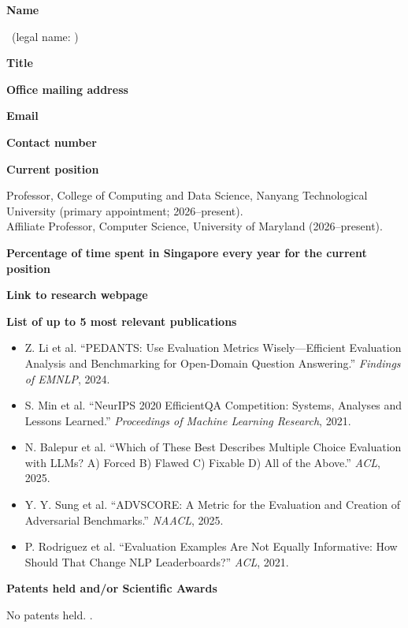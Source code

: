 \documentclass[12pt,a4paper]{article}
\newcommand{\field}[2]{\noindent
  \begin{minipage}[t]{0.31\linewidth}\raggedright\textbf{#1}\end{minipage}\hfill
  \begin{minipage}[t]{0.67\linewidth}\raggedright#2\end{minipage}
  \par\vspace{2pt}}
\begin{document}
\raggedright
\field{Name}{\CVname\ (legal name: \CVlegalname)}
\field{Title}{\CVtitle}
\field{Office mailing address}{\CVaddress}
\field{Email}{\href{mailto:\CVemail}{\CVemail}}
\field{Contact number}{\CVphone}
\field{Current position}{Professor, College of Computing and Data Science, Nanyang Technological University (primary appointment; 2026--present). \\ Affiliate Professor, Computer Science, University of Maryland (2026--present).}
\field{Percentage of time spent in Singapore every year for the current position}{\CVsingaporetime}
\field{Link to research webpage}{\href{\CVweb}{\CVweb}}

\field{List of up to 5 most relevant publications}{
  \begin{itemize}
    \item Z. Li et al. ``PEDANTS: Use Evaluation Metrics Wisely---Efficient Evaluation Analysis and Benchmarking for Open-Domain Question Answering.'' \textit{Findings of EMNLP}, 2024.
    \item S. Min et al. ``NeurIPS 2020 EfficientQA Competition: Systems, Analyses and Lessons Learned.'' \textit{Proceedings of Machine Learning Research}, 2021.
    \item N. Balepur et al. ``Which of These Best Describes Multiple Choice Evaluation with LLMs? A) Forced B) Flawed C) Fixable D) All of the Above.'' \textit{ACL}, 2025.
    \item Y. Y. Sung et al. ``ADVSCORE: A Metric for the Evaluation and Creation of Adversarial Benchmarks.'' \textit{NAACL}, 2025.
    \item P. Rodriguez et al. ``Evaluation Examples Are Not Equally Informative: How Should That Change NLP Leaderboards?'' \textit{ACL}, 2021.
  \end{itemize}}

\field{Patents held and/or Scientific Awards}{No patents held. \fullawards{}.}
\end{document}
